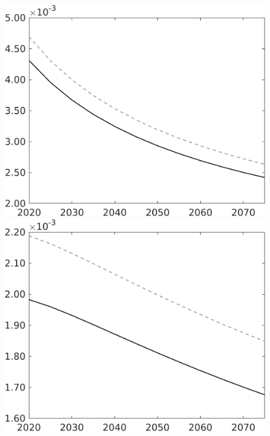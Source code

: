 \documentclass[12pt]{article}
\begin{document}
\begin{figure}[h!!]
\begin{minipage}[]{0.32\textwidth}
	\end{minipage}	
	\begin{minipage}[]{0.32\textwidth}
		\includegraphics[width=1\textwidth]{../../codding_model/own_basedOnFried/optimalPol_010922_revision/figures/all_13Sept22/CompTaul_Equlab_LFBAU_Reg0_Lf_spillover0_nsk0_xgr1_knspil0_sep1_countec0_GovRev0_etaa0.79_lgd0.png}
	\end{minipage}	
	\begin{minipage}[]{0.32\textwidth}
		\includegraphics[width=1\textwidth]{../../codding_model/own_basedOnFried/optimalPol_010922_revision/figures/all_13Sept22/CompTaul_Equlab_LFBAU_Reg0_Lg_spillover0_nsk0_xgr1_knspil0_sep1_countec0_GovRev0_etaa0.79_lgd0.png}

\end{minipage}
\end{figure}
\end{document}
